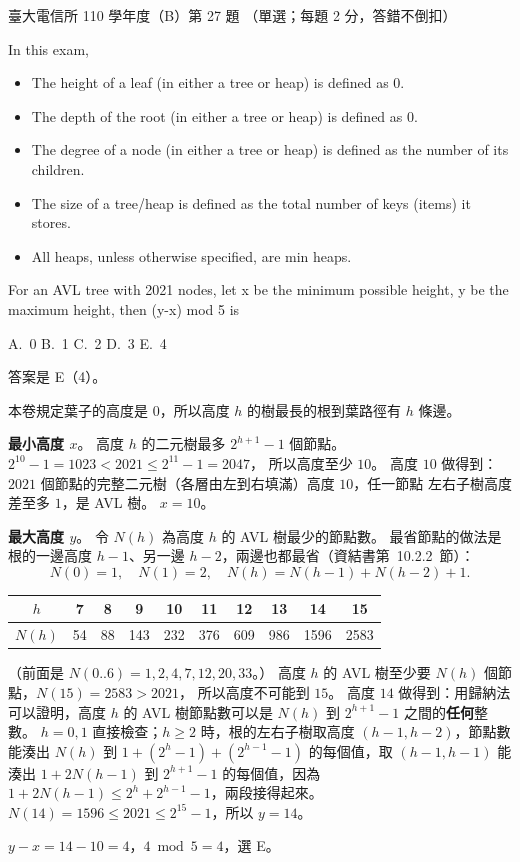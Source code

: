 \begin{pastexam}[label={px:ntu-110-comm-dsa-27}]{臺大電信所 110 學年度（B）第 27 題}
（單選；每題 2 分，答錯不倒扣）

In this exam,
\begin{itemize}
\item The height of a leaf (in either a tree or heap) is defined as 0.
\item The depth of the root (in either a tree or heap) is defined as 0.
\item The degree of a node (in either a tree or heap) is defined as the number of its children.
\item The size of a tree/heap is defined as the total number of keys (items) it stores.
\item All heaps, unless otherwise specified, are min heaps.
\end{itemize}

For an AVL tree with 2021 nodes, let x be the minimum possible height, y be the maximum height, then (y-x) mod 5 is

A.~0 \qquad B.~1 \qquad C.~2 \qquad D.~3 \qquad E.~4
\end{pastexam}

\begin{pastsoln}
答案是 E（4）。

本卷規定葉子的高度是 $0$，所以高度 $h$ 的樹最長的根到葉路徑有 $h$ 條邊。

\textbf{最小高度 $x$}。 高度 $h$ 的二元樹最多 $2^{h+1} - 1$ 個節點。 $2^{10} - 1 = 1023 < 2021 \le 2^{11} - 1 = 2047$，
所以高度至少 $10$。 高度 $10$ 做得到：$2021$ 個節點的完整二元樹（各層由左到右填滿）高度 $10$，任一節點
左右子樹高度差至多 $1$，是 AVL 樹。 $x = 10$。

\textbf{最大高度 $y$}。 令 $N(h)$ 為高度 $h$ 的 AVL 樹最少的節點數。 最省節點的做法是根的一邊高度
$h - 1$、另一邊 $h - 2$，兩邊也都最省（資結書第~10.2.2~節）：
\[
N(0) = 1,\quad N(1) = 2,\quad N(h) = N(h-1) + N(h-2) + 1.
\]
\begin{center}
\begin{tabular}{c*{9}{c}}
\toprule
$h$ & 7 & 8 & 9 & 10 & 11 & 12 & 13 & 14 & 15 \\
\midrule
$N(h)$ & 54 & 88 & 143 & 232 & 376 & 609 & 986 & 1596 & 2583 \\
\bottomrule
\end{tabular}
\end{center}
（前面是 $N(0..6) = 1, 2, 4, 7, 12, 20, 33$。） 高度 $h$ 的 AVL 樹至少要 $N(h)$ 個節點，$N(15) = 2583 > 2021$，
所以高度不可能到 $15$。 高度 $14$ 做得到：用歸納法可以證明，高度 $h$ 的 AVL 樹節點數可以是
$N(h)$ 到 $2^{h+1} - 1$ 之間的\textbf{任何}整數。 $h = 0, 1$ 直接檢查；$h \ge 2$ 時，根的左右子樹取高度
$(h-1, h-2)$，節點數能湊出 $N(h)$ 到 $1 + (2^{h} - 1) + (2^{h-1} - 1)$ 的每個值，取 $(h-1, h-1)$ 能湊出
$1 + 2N(h-1)$ 到 $2^{h+1} - 1$ 的每個值，因為 $1 + 2N(h-1) \le 2^{h} + 2^{h-1} - 1$，兩段接得起來。
$N(14) = 1596 \le 2021 \le 2^{15} - 1$，所以 $y = 14$。

$y - x = 14 - 10 = 4$，$4 \bmod 5 = 4$，選 E。
\end{pastsoln}
